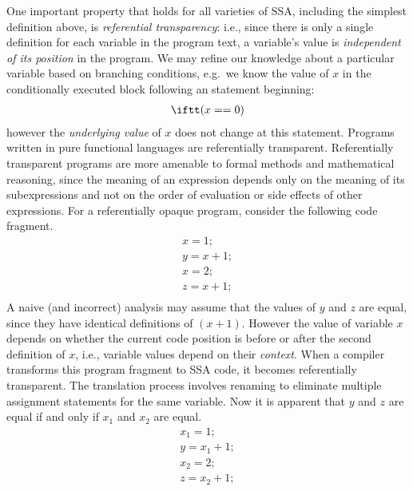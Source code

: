 One important property that holds for all varieties of SSA, including the simplest definition above, is \emph{referential transparency}: 
i.e., since there is only a single definition for each variable in the program text, a variable's value is \textit{independent of its position} in the program. 
We may refine our knowledge about a particular variable based on branching conditions, e.g.\ we know the value of $x$ in the conditionally executed block following an \iftt statement beginning: \begin{equation*} \begin{array}{l} \iftt (x==0) \end{array} \end{equation*} however the \textit{underlying value} of $x$ does not change at this \iftt statement. 
Programs written in pure functional languages are referentially transparent.
%
Referentially transparent programs are more amenable to formal methods and mathematical reasoning, since the meaning of an expression depends only on the meaning of its subexpressions and not on the order of evaluation or side effects of other expressions.
%
For a referentially opaque program, consider the following code fragment.
\begin{equation*} \begin{array}{l} x = 1;\\ y = x + 1;\\ x = 2;\\ z = x + 1;\\ \end{array} \end{equation*}
A naive (and incorrect) analysis may assume that the values of $y$ and $z$ are equal, since they have identical definitions of $(x+1)$. 
However the value of variable $x$ depends on whether the current code position is before or after the second definition of $x$, i.e., variable values depend on their \textit{context}.
%
When a compiler transforms this program fragment to SSA code, it becomes referentially transparent. 
The translation process involves renaming to eliminate multiple assignment statements for the same variable. 
Now it is apparent that $y$ and $z$ are equal if and only if $x_1$ and $x_2$ are equal.
\begin{equation*} \begin{array}{l} x_1 = 1;\\ y  = x_1 + 1;\\ x_2 = 2;\\ z  = x_2 + 1;
\end{array} \end{equation*}


